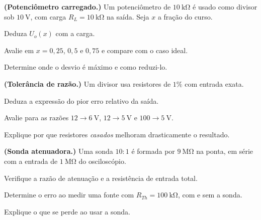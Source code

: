 \begin{questao}[4]{}

\textbf{(Potenciômetro carregado.)} Um potenciômetro de $\SI{10}{\kilo\ohm}$
é usado como divisor sob $\SI{10}{\volt}$, com carga
$R_L=\SI{10}{\kilo\ohm}$ na saída. Seja $x$ a fração do curso.
\begin{itensq}
\item Deduza $U_o(x)$ com a carga.
\item Avalie em $x=0{,}25$, $0{,}5$ e $0{,}75$ e compare com o caso ideal.
\item Determine onde o desvio é máximo e como reduzi-lo.
\end{itensq}


\end{questao}
\begin{questao}[4]{}

\textbf{(Tolerância de razão.)} Um divisor usa resistores de $1\%$ com entrada
exata.
\begin{itensq}
\item Deduza a expressão do pior erro relativo da saída.
\item Avalie para as razões $12\to\SI{6}{\volt}$, $12\to\SI{5}{\volt}$ e
      $100\to\SI{5}{\volt}$.
\item Explique por que resistores \emph{casados} melhoram drasticamente o
      resultado.
\end{itensq}


\end{questao}
\begin{questao}[4]{}

\textbf{(Sonda atenuadora.)} Uma sonda $10{:}1$ é formada por
$\SI{9}{\mega\ohm}$ na ponta, em série com a entrada de
$\SI{1}{\mega\ohm}$ do osciloscópio.
\begin{itensq}
\item Verifique a razão de atenuação e a resistência de entrada total.
\item Determine o erro ao medir uma fonte com $R_{Th}=\SI{100}{\kilo\ohm}$,
      com e sem a sonda.
\item Explique o que se perde ao usar a sonda.
\end{itensq}


\end{questao}
